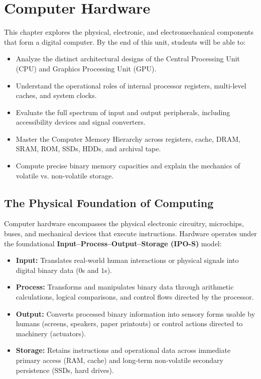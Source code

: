 \chapter{Computer Hardware}
\label{chap:computer_hardware}

\begin{tcolorbox}[enhanced, colback=boxnavybg, colframe=brandnavy, boxrule=1.2pt, arc=4pt, title={\Large\bfseries\sffamily Unit 3 Overview \& Learning Objectives}]
\sffamily\normalsize
This chapter explores the physical, electronic, and electromechanical components that form a digital computer. By the end of this unit, students will be able to:
\begin{itemize}[leftmargin=1.2em, itemsep=2pt, topsep=3pt]
    \item Analyze the distinct architectural designs of the Central Processing Unit (CPU) and Graphics Processing Unit (GPU).
    \item Understand the operational roles of internal processor registers, multi-level caches, and system clocks.
    \item Evaluate the full spectrum of input and output peripherals, including accessibility devices and signal converters.
    \item Master the Computer Memory Hierarchy across registers, cache, DRAM, SRAM, ROM, SSDs, HDDs, and archival tape.
    \item Compute precise binary memory capacities and explain the mechanics of volatile vs. non-volatile storage.
\end{itemize}
\end{tcolorbox}

\section{The Physical Foundation of Computing}

Computer hardware encompasses the physical electronic circuitry, microchips, buses, and mechanical devices that execute instructions. Hardware operates under the foundational \textbf{Input--Process--Output--Storage (IPO-S)} model:
\begin{itemize}[leftmargin=1.2em]
    \item \textbf{Input:} Translates real-world human interactions or physical signals into digital binary data ($0$s and $1$s).
    \item \textbf{Process:} Transforms and manipulates binary data through arithmetic calculations, logical comparisons, and control flows directed by the processor.
    \item \textbf{Output:} Converts processed binary information into sensory forms usable by humans (screens, speakers, paper printouts) or control actions directed to machinery (actuators).
    \item \textbf{Storage:} Retains instructions and operational data across immediate primary access (RAM, cache) and long-term non-volatile secondary persistence (SSDs, hard drives).
\end{itemize}

